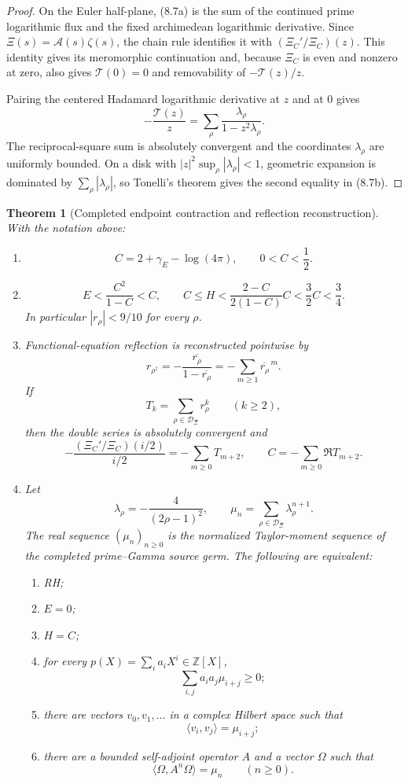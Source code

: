 \documentclass[11pt]{article}
\newtheorem{theorem}{Theorem}[section]
\newcommand{\XiR}{\Xi}
\begin{document}
\begin{proof}
On the Euler half-plane, \textup{(8.7a)} is the sum of the continued prime logarithmic flux and
the fixed archimedean logarithmic derivative.  Since
$\XiR(s)=\mathcal A(s)\zeta(s)$, the chain rule identifies it with
$(\Xi_C'/\Xi_C)(z)$.  This identity gives its meromorphic continuation and, because $\Xi_C$ is
even and nonzero at zero, also gives $\mathcal T(0)=0$ and removability of
$-\mathcal T(z)/z$.

Pairing the centered Hadamard logarithmic derivative at $z$ and at $0$ gives
\[
 -\frac{\mathcal T(z)}z
 =\sum_\rho\frac{\lambda_\rho}{1-z^2\lambda_\rho}.
\]
The reciprocal-square sum is absolutely convergent and the coordinates $\lambda_\rho$ are
uniformly bounded.  On a disk with
$|z|^2\sup_\rho|\lambda_\rho|<1$, geometric expansion is dominated by
$\sum_\rho|\lambda_\rho|$, so Tonelli's theorem gives the second equality in
\textup{(8.7b)}.
\end{proof}

\begin{theorem}[Completed endpoint contraction and reflection reconstruction]
\label{thm:endpoint-reflection-main}
With the notation above:
\begin{enumerate}[label=\textup{(\roman*)}]
\item
\[
 C=2+\gamma_{\!E}-\log(4\pi),\qquad 0<C<\frac12.
 \tag{8.8}
\]
\item
\[
 E<\frac{C^2}{1-C}<C,\qquad
 C\le H<\frac{2-C}{2(1-C)}C<\frac32C<\frac34.
 \tag{8.9}
\]
In particular $|r_\rho|<9/10$ for every $\rho$.
\item Functional-equation reflection is reconstructed pointwise by
\[
 r_{\rho^\dagger}
 =-\frac{\overline{r_\rho}}{1-\overline{r_\rho}}
 =-\sum_{m\ge1}\overline{r_\rho}^{\,m}.
 \tag{8.10}
\]
If
\[
 T_k=\sum_{\rho\in\mathcal D_\Xi}r_\rho^k\qquad(k\ge2),
 \tag{8.11}
\]
then the double series is absolutely convergent and
\[
 -\frac{(\Xi_C'/\Xi_C)(i/2)}{i/2}
 =-\sum_{m\ge0}T_{m+2},\qquad
 C=-\sum_{m\ge0}\Re T_{m+2}.
 \tag{8.12}
\]
\item Let
\[
 \lambda_\rho=-\frac4{(2\rho-1)^2},\qquad
 \mu_n=\sum_{\rho\in\mathcal D_\Xi}\lambda_\rho^{n+1}.
 \tag{8.13}
\]
The real sequence $(\mu_n)_{n\ge0}$ is the normalized Taylor-moment sequence of the completed
prime--Gamma source germ.  The following are equivalent:
\begin{enumerate}[label=\textup{(\alph*)}]
\item RH;
\item $E=0$;
\item $H=C$;
\item for every $p(X)=\sum_i a_iX^i\in\mathbb Z[X]$,
\[
 \sum_{i,j}a_i a_j\mu_{i+j}\ge0;
 \tag{8.14}
\]
\item there are vectors $v_0,v_1,\ldots$ in a complex Hilbert space such that
\[
 \langle v_i,v_j\rangle=\mu_{i+j};
 \tag{8.15}
\]
\item there are a bounded self-adjoint operator $A$ and a vector $\Omega$ such that
\[
 \langle\Omega,A^n\Omega\rangle=\mu_n\qquad(n\ge0).
 \tag{8.16}
\]
\end{enumerate}
\end{enumerate}
\end{theorem}
\end{document}
